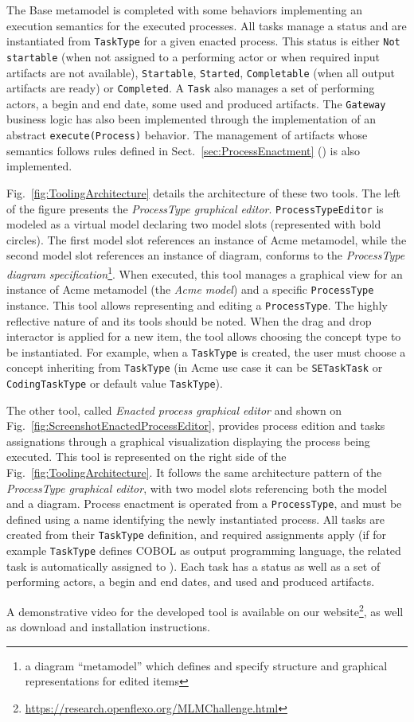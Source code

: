 The Base metamodel is completed with some behaviors implementing an execution
semantics for the executed processes. All tasks manage a status and are
instantiated from \texttt{TaskType} for a given enacted process. This status is
either \texttt{Not startable} (when not assigned to a performing actor or when
required input artifacts are not available), \texttt{Startable},
\texttt{Started}, \texttt{Completable} (when all output artifacts are ready) or
\texttt{Completed}. A \texttt{Task} also manages a set of performing actors, a
begin and end date, some used and produced artifacts. The \texttt{Gateway}
business logic has also been implemented through the implementation of an
abstract \texttt{execute(Process)} behavior. The management of artifacts whose
semantics follows rules defined in Sect.~\ref{sec:ProcessEnactment} ()
is also implemented.

Fig.~\ref{fig:ToolingArchitecture} details the architecture of these two tools.
The left of the figure presents the \textit{ProcessType graphical editor}.
\texttt{ProcessTypeEditor} is modeled as a virtual model declaring two model
slots (represented with bold circles). The first model slot references an
instance of Acme metamodel, while the second model slot references an instance
of diagram, conforms to the \textit{ProcessType diagram
specification}\footnote{a diagram \enquote{metamodel} which defines and specify
structure and graphical representations for edited items}. When executed, this
tool manages a graphical view for an instance of Acme metamodel (the
\textit{Acme model}) and a specific \texttt{ProcessType} instance. This tool
allows representing and editing a \texttt{ProcessType}. The highly reflective
nature of \FML and its tools should be noted. When the drag and drop interactor
is applied for a new item, the tool allows choosing the concept type to be
instantiated. For example, when a \texttt{TaskType} is created, the user must
choose a concept inheriting from \texttt{TaskType} (in Acme use case it can be
  \texttt{SETaskTask} or \texttt{CodingTaskType} or default value
\texttt{TaskType}).

The other tool, called \textit{Enacted process graphical editor} and shown on
Fig.~\ref{fig:ScreenshotEnactedProcessEditor}, provides process edition and
tasks assignations through a graphical visualization displaying the process
being executed. This tool is represented on the right side of the
Fig.~\ref{fig:ToolingArchitecture}. It follows the same architecture pattern of
the \textit{ProcessType graphical editor}, with two model slots referencing
both the model and a diagram. Process enactment is operated from a
\texttt{ProcessType}, and must be defined using a name identifying the newly
instantiated process. All tasks are created from their \texttt{TaskType}
definition, and required assignments apply (if for example 
\texttt{TaskType} defines COBOL as output programming language, the related
task is automatically assigned to ). Each task has a status as
well as a set of performing actors, a begin and end dates, and used and
produced artifacts.

A demonstrative video for the developed tool is available on our
website\footnote{\url{https://research.openflexo.org/MLMChallenge.html}}, as
well as download and installation instructions.
